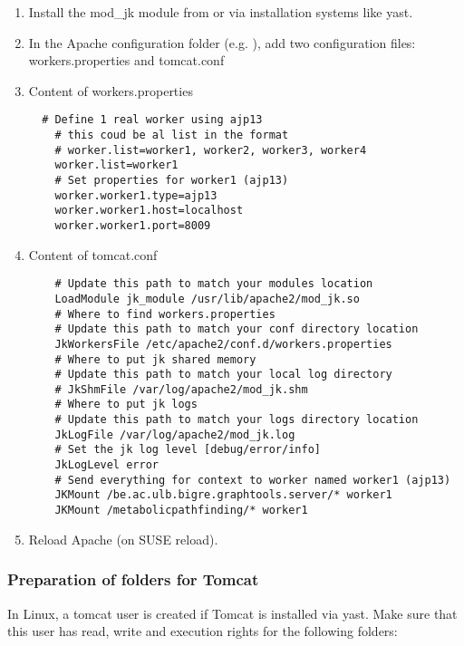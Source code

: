 \documentclass{book}
\begin{document}
\begin{enumerate}
\item Install the mod\_jk module from 
      or via installation systems like yast.
\item In the Apache configuration folder
(e.g. ), add two configuration files: workers.properties and tomcat.conf
\item Content of workers.properties
\begin{verbatim}
  # Define 1 real worker using ajp13
    # this coud be al list in the format
    # worker.list=worker1, worker2, worker3, worker4
    worker.list=worker1
    # Set properties for worker1 (ajp13)
    worker.worker1.type=ajp13
    worker.worker1.host=localhost
    worker.worker1.port=8009
\end{verbatim}
\item Content of tomcat.conf
\begin{verbatim}
    # Update this path to match your modules location
    LoadModule jk_module /usr/lib/apache2/mod_jk.so
    # Where to find workers.properties
    # Update this path to match your conf directory location
    JkWorkersFile /etc/apache2/conf.d/workers.properties
    # Where to put jk shared memory
    # Update this path to match your local log directory
    # JkShmFile /var/log/apache2/mod_jk.shm
    # Where to put jk logs
    # Update this path to match your logs directory location
    JkLogFile /var/log/apache2/mod_jk.log
    # Set the jk log level [debug/error/info]
    JkLogLevel error
    # Send everything for context to worker named worker1 (ajp13)
    JKMount /be.ac.ulb.bigre.graphtools.server/* worker1
    JKMount /metabolicpathfinding/* worker1
\end{verbatim}
\item Reload Apache (on SUSE  reload).
\end{enumerate}

\subsubsection{Preparation of folders for Tomcat}
In Linux, a tomcat user is created if Tomcat is installed via yast. Make sure
that this user has read, write and execution rights for the following folders:\\
\\
\\
\\
\\
\\
\end{document}
